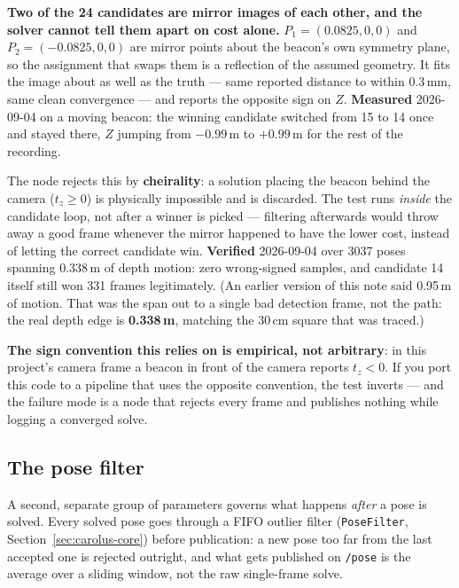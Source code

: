 \documentclass[11pt]{report}
\newenvironment{warningbox}%
  {\begin{lrbox}{\warnbox}\begin{minipage}{0.90\textwidth}}%
  {\end{minipage}\end{lrbox}%
   \begin{center}\fcolorbox{black}{codebg}{\usebox{\warnbox}}\end{center}}
\begin{document}
\begin{warningbox}
\textbf{Two of the 24 candidates are mirror images of each other, and the
solver cannot tell them apart on cost alone.} $P_1=(0.0825,0,0)$ and
$P_2=(-0.0825,0,0)$ are mirror points about the beacon's own symmetry
plane, so the assignment that swaps them is a reflection of the assumed
geometry. It fits the image about as well as the truth --- same reported
distance to within 0.3\,mm, same clean convergence --- and reports the
opposite sign on $Z$. \textbf{Measured} 2026-09-04 on a moving beacon: the
winning candidate switched from 15 to 14 once and stayed there,
$Z$ jumping from $-0.99$\,m to $+0.99$\,m for the rest of the recording.

The node rejects this by \textbf{cheirality}: a solution placing the
beacon behind the camera ($t_z \geq 0$) is physically impossible and is
discarded. The test runs \emph{inside} the candidate loop, not after a
winner is picked --- filtering afterwards would throw away a good frame
whenever the mirror happened to have the lower cost, instead of letting
the correct candidate win. \textbf{Verified} 2026-09-04 over 3037 poses
spanning 0.338\,m of depth motion: zero wrong-signed samples, and candidate 14
itself still won 331 frames legitimately. (An earlier version of this note
said 0.95\,m of motion. That was the span out to a single bad detection
frame, not the path: the real depth edge is \textbf{0.338\,m}, matching the
30\,cm square that was traced.)

\textbf{The sign convention this relies on is empirical, not arbitrary}:
in this project's camera frame a beacon in front of the camera reports
$t_z<0$. If you port this code to a pipeline that uses the opposite
convention, the test inverts --- and the failure mode is a node that
rejects every frame and publishes nothing while logging a converged solve.
\end{warningbox}

\subsection{The pose filter}
\label{sec:pose-filter}

A second, separate group of parameters governs what happens \emph{after} a
pose is solved. Every solved pose goes through a FIFO outlier filter
(\texttt{PoseFilter}, Section~\ref{sec:carolus-core}) before publication: a
new pose too far from the last accepted one is rejected outright, and what
gets published on \texttt{/pose} is the average over a sliding window, not
the raw single-frame solve.
\end{document}
